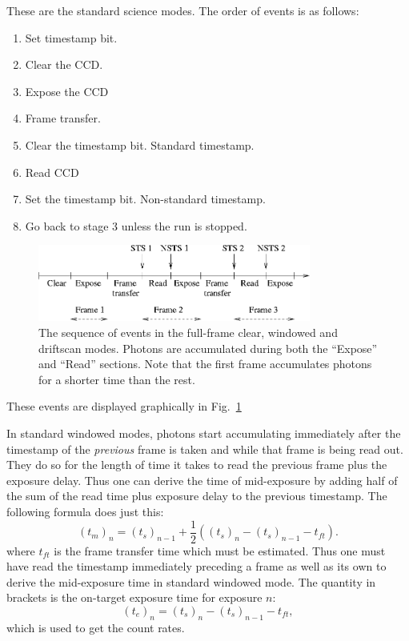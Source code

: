 \documentclass[10pt,a4paper,twocolumn]{article}
\begin{document}
These are the standard science modes. The order of events is as follows:
\begin{enumerate}

\item Set timestamp bit. 

\item Clear the CCD.

\item Expose the CCD

\item Frame transfer. 

\item Clear the timestamp bit. Standard timestamp.

\item Read CCD

\item Set the timestamp bit. Non-standard timestamp.

\item Go back to stage 3 unless the run is stopped.

\end{enumerate}
\begin{figure}
\hspace*{\fill}
\includegraphics[width=0.8\textwidth]{window_modes}
\hspace*{\fill}

\caption{The sequence of events in the full-frame clear, windowed and
driftscan modes. Photons are accumulated during both the ``Expose''
and ``Read'' sections. Note that the first frame accumulates photons
for a shorter time than the rest.}
\label{fig:window_modes}
\end{figure}
These events are displayed graphically in Fig.~\ref{fig:window_modes}

In standard windowed modes, photons start accumulating immediately
after the timestamp of the \emph{previous} frame is taken and while
that frame is being read out. They do so for the length of time it takes to read the previous frame
plus the exposure delay. Thus one can derive the time of mid-exposure
by adding half of the sum of the read time plus exposure delay to the
previous timestamp. The following formula does just this:
\begin{equation}
(t_m)_n = (t_s)_{n-1} + \frac{1}{2}\left( (t_s)_{n} - (t_s)_{n-1} -  t_{ft} \right).
\end{equation} 
where $t_{ft}$ is the frame transfer time which must be estimated.
Thus one must have read the timestamp immediately preceding a frame as
well as its own to derive the mid-exposure time in standard windowed
mode. The quantity in brackets is the on-target exposure time 
for exposure $n$:
\begin{equation}
(t_e)_n = (t_s)_{n} - (t_s)_{n-1} -  t_{ft},
\end{equation}
which is used to get the count rates.
\end{document}
